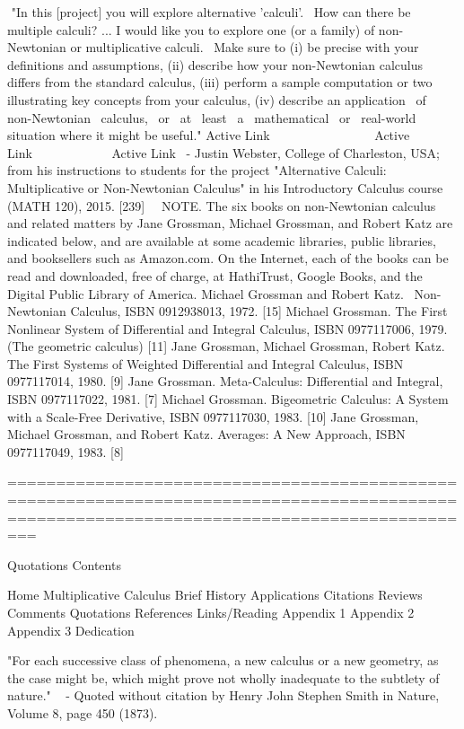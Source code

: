\documentclass[12pt]{article}
\begin{document}
 "In this [project] you will explore alternative 'calculi'.  How can there be multiple calculi? ... I would like you to explore one (or a family) of non-Newtonian or multiplicative calculi.  Make sure to (i) be precise with your definitions and assumptions, (ii) describe how your non-Newtonian calculus differs from the standard calculus, (iii) perform a sample computation or two illustrating key concepts from your calculus, (iv) describe an application  of  non-Newtonian  calculus,  or  at  least  a  mathematical  or  real-world  situation where it might be useful." Active Link                 Active Link             Active Link  - Justin Webster, College of Charleston, USA; from his instructions to students for the project "Alternative Calculi: Multiplicative or Non-Newtonian Calculus" in his Introductory Calculus course (MATH 120), 2015. [239]
  
NOTE. The six books on non-Newtonian calculus and related matters by Jane Grossman, Michael Grossman, and Robert Katz are indicated below, and are available at some academic libraries, public libraries, and booksellers such as Amazon.com. On the Internet, each of the books can be read and downloaded, free of charge, at HathiTrust, Google Books, and the Digital Public Library of America.
Michael Grossman and Robert Katz.  Non-Newtonian Calculus, ISBN 0912938013, 1972. [15] 
Michael Grossman. The First Nonlinear System of Differential and Integral Calculus, ISBN 0977117006, 1979. (The geometric calculus) [11] 
Jane Grossman, Michael Grossman, Robert Katz. The First Systems of Weighted Differential and Integral Calculus, ISBN 0977117014, 1980. [9]
Jane Grossman. Meta-Calculus: Differential and Integral, ISBN 0977117022, 1981. [7]
Michael Grossman. Bigeometric Calculus: A System with a Scale-Free Derivative, ISBN 0977117030, 1983. [10]
Jane Grossman, Michael Grossman, and Robert Katz. Averages: A New Approach, ISBN 0977117049, 1983. [8]

=============================================================================================================================================

Quotations
Contents

Home
Multiplicative Calculus
Brief History
Applications
Citations
Reviews
Comments
Quotations
References
Links/Reading
Appendix 1
Appendix 2
Appendix 3
Dedication

"For each successive class of phenomena, a new calculus or a new geometry, as the case might be, which might prove not wholly inadequate to the subtlety of nature."
  - Quoted without citation by Henry John Stephen Smith in Nature, Volume 8, page 450 (1873).
\end{document}
